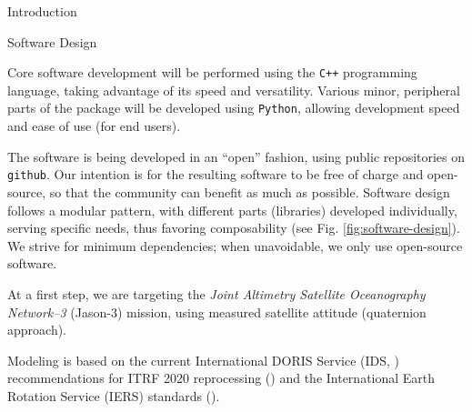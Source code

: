 \documentclass[final,a0,portrait]{beamer}
\newlength{\onecolwid}
\begin{document}
\begin{frame}[t]
\begin{columns}[t]
\begin{column}{\onecolwid}
\begin{block}{Introduction}
\end{block}

\begin{block}{Software Design}
{\small
Core software development will be performed using the \texttt{C++} programming 
language, taking advantage of its speed and versatility. Various minor, 
peripheral parts of the package will be developed using \texttt{Python}, 
allowing development speed and ease of use (for end users).\hfill \break

The software is being developed in an ``open'' fashion, using public 
repositories on \texttt{github}. Our intention is for the resulting software 
to be free of charge and open-source, so that the community can benefit as 
much as possible. Software design follows a modular pattern, with different parts 
(libraries) developed individually, serving specific needs, thus favoring 
composability (see Fig. \ref{fig:software-design}). We strive for minimum 
dependencies; when unavoidable, we only use open-source software. \hfill \break

At a first step, we are targeting the \emph{Joint Altimetry Satellite 
Oceanography Network–3} (Jason-3) mission, using measured satellite attitude 
(quaternion approach). \hfill \break

Modeling is based on the current International DORIS Service (IDS, \cite{10.1007/1345_2015_164}) recommendations 
for ITRF 2020 reprocessing (\cite{ids-itrf2020-recommendations}) and the 
International Earth Rotation Service (IERS) standards (\cite{iers2010}).
}
\end{block}



\end{column}
\end{columns}
\end{frame}
\end{document}
